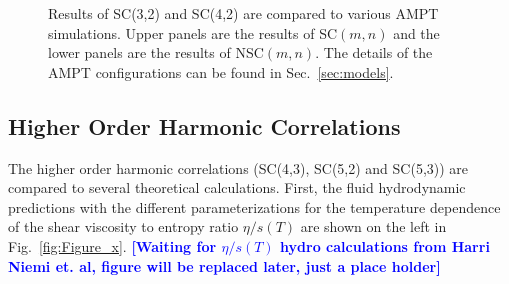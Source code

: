 \documentclass[ALICE,manyauthors]{cernphprep}
\begin{document}
\begin{figure}[p]
\begin{center}
        \caption{Results of  SC(3,2) and SC(4,2) are compared to various AMPT simulations. Upper panels are the results of SC$(m,n)$ and the lower panels are the results of NSC$(m,n)$. The details of the AMPT configurations can be found in Sec.~\ref{sec:models}.}
        \label{fig:Figure_5}
        \end{center}   
 \end{figure}

\pagebreak

\subsection{Higher Order Harmonic Correlations}
The higher order harmonic correlations (SC(4,3), SC(5,2) and SC(5,3)) are compared to several theoretical calculations. 
First, the fluid hydrodynamic predictions with the different parameterizations for the temperature dependence of the shear viscosity to entropy ratio $\eta/s(T)$ are shown on the left in Fig.~\ref{fig:Figure_x}. 
\noindent\textbf{\textcolor{blue}{[Waiting for $\eta/s(T)$ hydro calculations from Harri Niemi et. al, figure will be replaced later, just a place holder]}}
\end{document}
